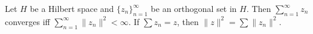 Let $H$ be a Hilbert space and $\{z_n\}_{n=1}^{\infty}$ be an orthogonal set in $H$. Then $\sum_{n=1}^{\infty} z_n$ converges iff $\sum_{n=1}^{\infty} \|z_n\|^2 < \infty$. If $\sum z_n = z$, then $\|z\|^2 = \sum \|z_n\|^2$.
